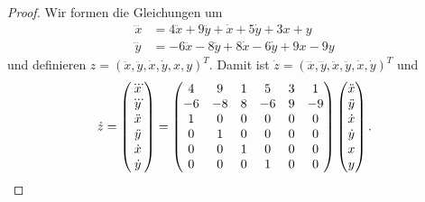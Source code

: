 \begin{proof}
	Wir formen die Gleichungen um
	\begin{align*}
		\dddot{x}&=4\ddot{x}+9\ddot{y}+\dot{x}+5\dot{y}+3x+y\\
		\dddot{y}&=-6\ddot{x}-8\ddot{y}+8\dot{x}-6\dot{y}+9x-9y
	\end{align*}
	und definieren $z=(\ddot{x}, \ddot{y}, \dot{x}, \dot{y}, x, y)^T$. Damit ist $\dot{z}=(\dddot{x}, \dddot{y}, \ddot{x}, \ddot{y}, \dot{x}, \dot{y})^T$ und
	\[
	\dot{z}=\begin{pmatrix} \dddot{x} \\ \dddot{y} \\ \ddot{x} \\ \ddot{y} \\ \dot{x} \\ \dot{y} \end{pmatrix}=\begin{pmatrix} 4 & 9 & 1 & 5 & 3 & 1 \\ -6 & -8 & 8 & -6 & 9 & -9 \\ 1 & 0 & 0 & 0 & 0 & 0 \\ 0 & 1 & 0 & 0 & 0 & 0 \\ 0 & 0 & 1 & 0 & 0 & 0 \\ 0 & 0 & 0 & 1 & 0 & 0 \end{pmatrix} \begin{pmatrix} \ddot{x} \\ \ddot{y} \\ \dot{x} \\ \dot{y} \\ x \\ y \end{pmatrix} 
	.\qedhere\] 
\end{proof}
